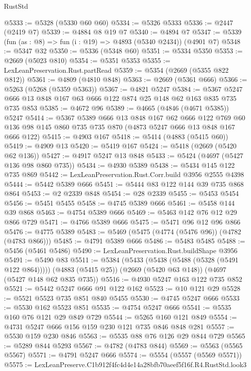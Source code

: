 \begin{lexlean}{RustStd}
\begin{coremodule}
@5333 := @5328 (@5330 @60 @60)
@5334 := @5326 @5333
@5336 := @2447 (@2419 @7)
@5339 := @4884 @8 @19 @7
@5340 := @4894 @7
@5347 := @5339 (fun (as : @8) => fun (i : @19) => @4893 (@5340 @2434)) (@4901 @7)
@5348 := @5347 @32
@5350 := @5336 (@5348 @60)
@5351 := @5334 @5350
@5353 := @2669 (@5023 @810)
@5354 := @5351 @5353
@5355 := LexLeanPreservation.Rust.partRead
@5359 := @5354 (@2669 (@5355 @822 @812))
@5361 := @4809 (@4810 @848)
@5363 := @2669 (@5361 @666)
@5366 := @5263 (@5268 (@5359 @5363))
@5367 := @4821 @5247
@5384 := @5367 @5247 @666 @13 @848 @167 @63 @666 @122 @874 @25 @148 @62 @163 @835 @735 @735 @853
@5385 := @4672 @96
@5389 := @4665 (@4846 (@4671 @5385)) @5247
@5414 := @5367
    @5389
    @666
    @13
    @848
    @167
    @62
    @666
    @122
    @769
    @60
    @136
    @98
    @145
    @860
    @735
    @735
    @870
    (@4873 @5247 @666 @13 @848 @167 @666 @122)
@5415 := @4903 @167
@5418 := @5414 (@4883 (@5415 @60))
@5419 := @4909 @13
@5420 := @5419 @167
@5424 := @5418 (@2669 (@5420 @62 @136))
@5427 := @4917 @5247 @13 @848
@5433 := @5424 (@4697 (@5427 @136 @98 @860 @735))
@5434 := @4930 @5389
@5438 := @5434 @145 @122 @735 @869
@5442 := LexLeanPreservation.Rust.Corr.build @3956 @2555 @4398
@5444 := @5442 @5389 @666
@5451 := @5444 @83 @122 @144 @39 @735 @868 @864
@5453 := @2 @2339 @848
@5454 := @28 @2339
@5455 := @5453 @5454
@5456 := @5451 @5455
@5458 := @4745 @5389 @666
@5461 := @5458 @144 @39 @868
@5463 := @4754 @5389 @666
@5469 := @5463 @142 @76 @12 @29 @866 @729
@5471 := @4766 @5389 @666
@5475 := @5471 @96 @12 @96 @866
@5476 := @4775 @5389
@5483 := @5469 (@5475 (@4774 (@5476 @96)) (@4782 (@4783 @866)))
@5485 := @4791 @5389 @666
@5486 := @5483 @5485
@5488 := @5456 (@5461 @5486)
@5490 := LexLeanPreservation.Rust.buildShape @3956
@5491 := @5490 @83
@5511 := @5384
    (@5433 (@5438 (@5488 (@5328 (@5491 @122 @864)))))
    (@4883 (@5415 @25))
    (@2669 (@5420 @63 @148))
    (@4697 (@5427 @148 @62 @835 @735))
@5516 := @4930 @5247 @163 @122 @735 @852
@5521 := @5442 @5247 @666 @91 @122 @162
@5523 := @10 @121 @29
@5528 := @5521 @5523 @735 @851 @840 @5455
@5530 := @4745 @5247 @666
@5533 := @5530 @162 @5523 @851
@5535 := @4754 @5247 @666
@5541 := @5535 @160 @76 @121 @29 @849 @729
@5544 := @5265 @160 @121 @849
@5554 := @4731 @5247 @666 @156 @159 @230 @121 @735 @846 @848 @281
@5557 := @5530 @159 @230 @846
@5563 := @5535 @88 @76 @126 @29 @844 @729
@5565 := @5289 @844 @5293
@5567 := @4782 (@4783 @844)
@5569 := @5563 (@5565 @5567)
@5571 := @4791 @5247 @666
@5574 := @5554 (@5557 (@5569 @5571))
@5575 := LexLeanPreserve.C1b912f4fc4d4e14a28bfb70aeef5f16f.R4.RustStd.look3

\end{coremodule}
\end{lexlean}
